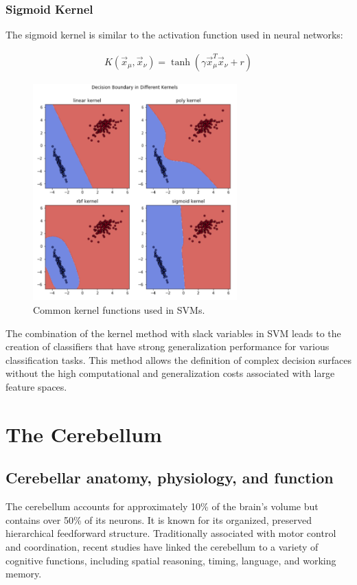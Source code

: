 \documentclass[11pt]{book} %
\begin{document}
\subsubsection{Sigmoid Kernel}
The sigmoid kernel is similar to the activation function used in neural networks:

\begin{align*}
    K(\vec{x}_\mu, \vec{x}_\nu) = \tanh(\gamma \vec{x}_\mu^T \vec{x}_\nu + r)
\end{align*}

\begin{figure}[ht]
    \centering
    \includegraphics[width=0.7\textwidth]{./Figs/Kernels.png}
    \caption{Common kernel functions used in SVMs.}
    \label{fig:kernel_functions}
\end{figure}


The combination of the kernel method with slack variables in SVM leads to the creation of classifiers 
that have strong generalization performance for various classification tasks. 
This method allows the definition of complex decision surfaces without the high computational and generalization costs associated with large feature spaces.


\section{The Cerebellum}

\subsection{Cerebellar anatomy, physiology, and function}
The cerebellum accounts for approximately 10\% of the brain's volume but contains over 50\% of its neurons. It is known for its organized, preserved hierarchical feedforward structure. Traditionally associated with motor control and coordination, recent studies have linked the cerebellum to a variety of cognitive functions, including spatial reasoning, timing, language, and working memory.
\end{document}
